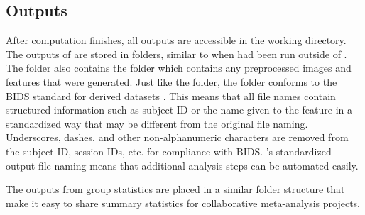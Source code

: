 \subsection{Outputs}

After computation finishes, all outputs are accessible in the working directory. The outputs of  are stored in  folders, similar to when  had been run outside of . The  folder also contains the folder  which contains any preprocessed images and features that were generated. Just like the  folder, the  folder conforms to the BIDS standard for derived datasets \parencite{bidscontributors2021}. This means that all file names contain structured information such as subject ID  or the name given to the feature  in a standardized way that may be different from the original file naming. Underscores, dashes, and other non-alphanumeric characters are removed from the subject ID, session IDs, etc. for compliance with BIDS. 's standardized output file naming means that additional analysis steps can be automated easily.

The outputs from group statistics are placed in a similar folder structure that make it easy to share summary statistics for collaborative meta-analysis projects.

